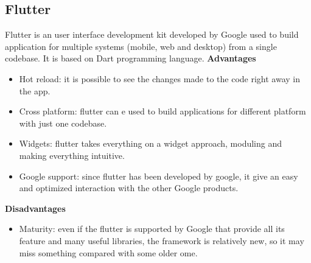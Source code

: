 \documentclass[../ITD.tex]{subfiles}
\begin{document}
    \subsection{Flutter}\label{subsec:flutter}
    Flutter is an user interface development kit developed by Google used to build application for multiple systems (mobile, web and desktop) from a single codebase.
    It is based on Dart programming language.
    \newline
    \textbf{Advantages}
    \begin{itemize}
        \item Hot reload: it is possible to see the changes made to the code right away in the app.
        \item Cross platform: flutter can e used to build applications for different platform with just one codebase.
        \item Widgets: flutter takes everything on a widget approach, moduling and making everything intuitive.
        \item Google support: since flutter has been developed by google, it give an easy and optimized interaction with the other Google products.
    \end{itemize}
    \newline
    \textbf{Disadvantages}
    \begin{itemize}
        \item Maturity: even if the flutter is supported by Google that provide all its feature and many useful libraries, the framework is relatively new, so it may miss something compared with some older ome.
    \end{itemize}
    \newline
\end{document}
